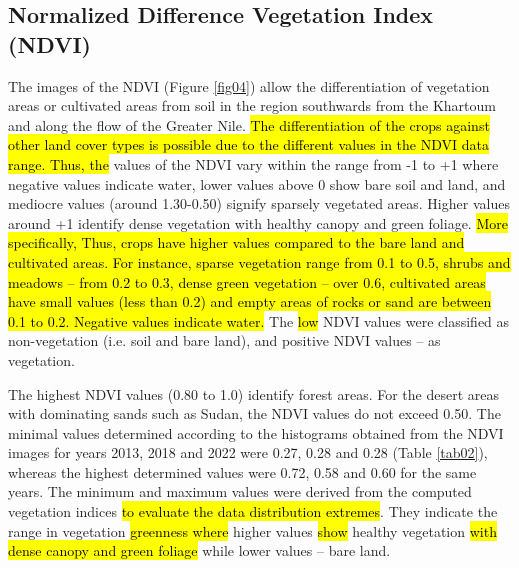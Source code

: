 \documentclass[jimaging,article,submit,pdftex,moreauthors]{Definitions/mdpi}
\begin{document}
\subsection{Normalized Difference Vegetation Index (NDVI)}
The images of the NDVI (Figure \ref{fig04}) allow the differentiation of vegetation areas or cultivated areas from soil in the region southwards from the Khartoum and along the flow of the Greater Nile. \hl{The differentiation of the crops against other land cover types is possible due to the different values in the NDVI data range. Thus, the} values of the NDVI vary within the range from -1 to +1 where negative values indicate water, lower values above 0 show bare soil and land, and mediocre values (around 1.30-0.50) signify sparsely vegetated areas. Higher values around +1 identify dense vegetation with healthy canopy and green foliage. \hl{More specifically, Thus, crops have higher values compared to the bare land and cultivated areas. For instance, sparse vegetation range from 0.1 to 0.5, shrubs and meadows -- from 0.2 to 0.3, dense green vegetation -- over 0.6, cultivated areas have small values (less than 0.2) and empty areas of rocks or sand are between 0.1 to 0.2. Negative values indicate water. }The \hl{low} NDVI values were classified as non-vegetation (i.e. soil and bare land), and positive NDVI values -- as vegetation. 

The highest NDVI values (0.80 to 1.0) identify forest areas. For the desert areas with dominating sands such as Sudan, the NDVI values do not exceed 0.50. The minimal values determined according to the histograms obtained from the NDVI images for years 2013, 2018 and 2022 were 0.27, 0.28 and 0.28 (Table \ref{tab02}), whereas the highest determined values were 0.72, 0.58 and 0.60 for the same years. The minimum and maximum values were derived from the computed vegetation indices \hl{to evaluate the data distribution extremes}. They indicate the range in vegetation \hl{greenness where} higher values \hl{show} healthy\hl{ }vegetation \hl{with dense canopy and green foliage} while lower values -- bare land. 
\end{document}
